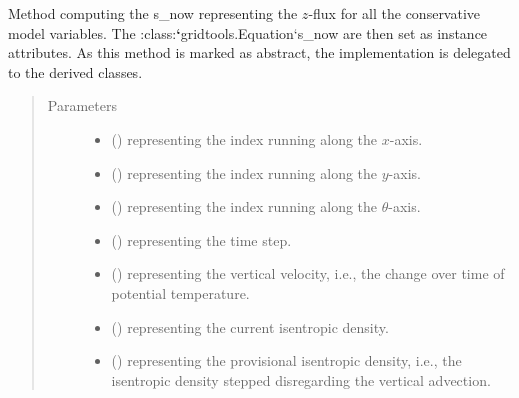 \documentclass[letterpaper,10pt,english]{sphinxmanual}
\begin{document}
\begin{fulllineitems}
\begin{fulllineitems}
\label{\detokenize{api:dycore.flux_isentropic.FluxIsentropic._compute_vertical_fluxes}}
Method computing the s\_now representing the \(z\)-flux for all the conservative
model variables. The :class:{\color{red}\bfseries{}{}`}gridtools.Equation{}`s\_now are then set as instance attributes.
As this method is marked as abstract, the implementation is delegated to the derived classes.
\begin{quote}\begin{description}
\item[{Parameters}] \leavevmode\begin{itemize}
\item {} 
 () \textendash{}  representing the index running along the \(x\)-axis.

\item {} 
 () \textendash{}  representing the index running along the \(y\)-axis.

\item {} 
 () \textendash{}  representing the index running along the \(\theta\)-axis.

\item {} 
 () \textendash{}  representing the time step.

\item {} 
 () \textendash{}  representing the vertical velocity, i.e., the change over time of potential temperature.

\item {} 
 () \textendash{}  representing the current isentropic density.

\item {} 
 () \textendash{}  representing the provisional isentropic density, i.e., the isentropic density stepped
disregarding the vertical advection.


\end{itemize}
\end{description}
\end{quote}
\end{fulllineitems}
\end{fulllineitems}
\end{document}

